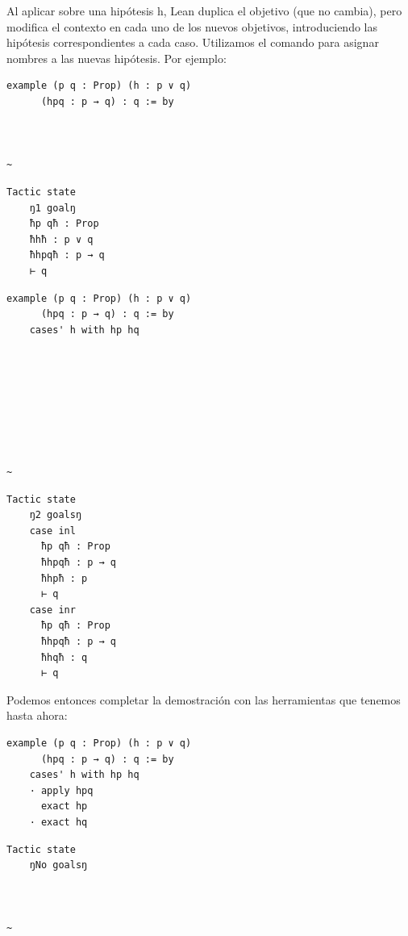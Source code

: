 Al aplicar  sobre una hipótesis h, Lean duplica el objetivo (que no cambia), pero modifica el contexto en cada uno de los nuevos objetivos, introduciendo las hipótesis correspondientes a cada caso. Utilizamos el comando  para asignar nombres a las nuevas hipótesis. Por ejemplo:

\begin{minipage}[t]{0.58\textwidth}
\begin{lstlisting}[language=lean]
  example (p q : Prop) (h : p ∨ q)
      (hpq : p → q) : q := by



~
\end{lstlisting}
\end{minipage}%
\hfill
\begin{minipage}[t]{0.40\textwidth}
\begin{lstlisting}[language=infoview]
  Tactic state
    ŋ1 goalŋ
    ħp qħ : Prop
    ħhħ : p ∨ q
    ħhpqħ : p → q
    ⊢ q
\end{lstlisting}
\end{minipage}
%
\noindent
\makebox[\textwidth]{$\downarrow$}
%
\begin{minipage}[t]{0.58\textwidth}
\begin{lstlisting}[language=lean]
  example (p q : Prop) (h : p ∨ q)
      (hpq : p → q) : q := by
    cases' h with hp hq







      
~
\end{lstlisting}
\end{minipage}%
\hfill
\begin{minipage}[t]{0.40\textwidth}
\begin{lstlisting}[language=infoview]
  Tactic state
    ŋ2 goalsŋ
    case inl
      ħp qħ : Prop
      ħhpqħ : p → q
      ħhpħ : p
      ⊢ q
    case inr
      ħp qħ : Prop
      ħhpqħ : p → q
      ħhqħ : q
      ⊢ q
\end{lstlisting}
\end{minipage}

Podemos entonces completar la demostración con las herramientas que tenemos hasta ahora:

\begin{minipage}[t]{0.58\textwidth}
\begin{lstlisting}[language=lean]
  example (p q : Prop) (h : p ∨ q)
      (hpq : p → q) : q := by
    cases' h with hp hq
    · apply hpq
      exact hp
    · exact hq
\end{lstlisting}
\end{minipage}%
\hfill
\begin{minipage}[t]{0.40\textwidth}
\begin{lstlisting}[language=infoview]
  Tactic state
    ŋNo goalsŋ



~
\end{lstlisting}
\end{minipage}


